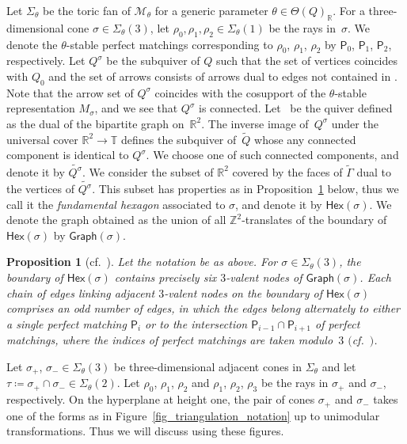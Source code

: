 \documentclass[10pt,a4paper]{amsart}
\numberwithin{equation}{section}
\newtheorem{Proposition}[Theorem]{Proposition}
\theoremstyle{definition}
\newcommand{\ZZ}{\mathbb{Z}}
\newcommand{\RR}{\mathbb{R}}
\newcommand{\TT}{\mathbb{T}}
\newcommand{\calM}{\mathcal{M}}
\newcommand{\sfP}{\mathsf{P}}
\newcommand{\Hex}{\mathsf{Hex}}
\newcommand{\Graph}{\mathsf{Graph}}
\begin{document}
Let $\Sigma_\theta$ be the toric fan of $\calM_\theta$ for a generic parameter $\theta\in\Theta(Q)_\RR$.
For a three-dimensional cone $\sigma\in\Sigma_\theta(3)$, let $\rho_0, \rho_1, \rho_2\in\Sigma_\theta(1)$ be the rays in~$\sigma$.
We denote the $\theta$-stable perfect matchings corresponding to $\rho_0$, $\rho_1$, $\rho_2$ by $\sfP_0$, $\sfP_1$, $\sfP_2$, respectively.
Let $Q^\sigma$ be the subquiver of $Q$ such that the set of vertices coincides with $Q_0$ and
the set of arrows consists of arrows dual to edges not contained in \smash{$\bigcup_{0\le i\le 2}\sfP_i$}.
Note that the arrow set of $Q^\sigma$ coincides with the cosupport of the $\theta$-stable representation $M_\sigma$,
and we see that $Q^\sigma$ is connected.
Let~ be the quiver defined as the dual of the bipartite graph \smash{$\widetilde{\Gamma}$} on~$\RR^2$.
The inverse image of~$Q^\sigma$ under the universal cover $\RR^2\rightarrow\TT$ defines the subquiver of~$\widetilde{Q}$
whose any connected component is identical to $Q^\sigma$.
We choose one of such connected components, and denote it by $\widetilde{Q^\sigma}$.
We consider the subset of $\RR^2$ covered by the faces of $\widetilde{\Gamma}$ dual to the vertices of $\widetilde{Q^\sigma}$.
This subset has properties as in Proposition~\ref{prop_hex_property} below,
thus we call it the \emph{fundamental hexagon} associated to $\sigma$, and denote it by $\Hex(\sigma)$.
We denote the graph obtained as the union of all $\ZZ^2$-translates of the boundary of $\Hex(\sigma)$ by $\Graph(\sigma)$.

\begin{Proposition}[{cf.\ \cite[Proposition~3.4 and its proof]{CHT}}]\label{prop_hex_property}
Let the notation be as above.
For $\sigma\in\Sigma_\theta(3)$, the boundary of $\Hex(\sigma)$ contains precisely six $3$-valent nodes of $\Graph(\sigma)$.
Each chain of edges linking adjacent $3$-valent nodes on the boundary of $\Hex(\sigma)$ comprises an odd number of edges, in which
the edges belong alternately to either a single perfect matching $\sfP_i$ or to the intersection $\sfP_{i-1}\cap\sfP_{i+1}$ of perfect matchings,
where the indices of perfect matchings are taken modulo~$3$ $($cf.\ {\rm \cite[\emph{Figure}~4]{CHT}}$)$.
\end{Proposition}

Let $\sigma_+$, $\sigma_-\in\Sigma_\theta(3)$ be three-dimensional adjacent cones in $\Sigma_\theta$ and let $\tau\coloneqq\sigma_+\cap \sigma_-\in\Sigma_\theta(2)$.
Let $\rho_0$, $\rho_1$, $\rho_2$ and $\rho_1$, $\rho_2$, $\rho_3$ be the rays in $\sigma_+$ and $\sigma_-$, respectively.
On the hyperplane at height one, the pair of cones $\sigma_+$ and $\sigma_-$ takes one of the forms as in Figure~\ref{fig_triangulation_notation}
up to unimodular transformations. Thus we will discuss using these figures.
\end{document}
